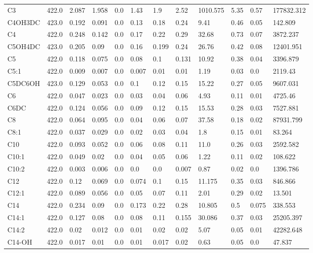 \begin{tabular}{llllllllllll}
C3 & 422.0 & 2.087 & 1.958 & 0.0 & 1.43 & 1.9 & 2.52 & 1010.575 & 5.35 & 0.57 & 177832.312 \\
C4OH\C3DC & 423.0 & 0.192 & 0.091 & 0.0 & 0.13 & 0.18 & 0.24 & 9.41 & 0.46 & 0.05 & 142.809 \\
C4 & 422.0 & 0.248 & 0.142 & 0.0 & 0.17 & 0.22 & 0.29 & 32.68 & 0.73 & 0.07 & 3872.237 \\
C5OH\C4DC & 423.0 & 0.205 & 0.09 & 0.0 & 0.16 & 0.199 & 0.24 & 26.76 & 0.42 & 0.08 & 12401.951 \\
C5 & 422.0 & 0.118 & 0.075 & 0.0 & 0.08 & 0.1 & 0.131 & 10.92 & 0.38 & 0.04 & 3396.879 \\
C5:1 & 422.0 & 0.009 & 0.007 & 0.0 & 0.007 & 0.01 & 0.01 & 1.19 & 0.03 & 0.0 & 2119.43 \\
C5DC\C6OH & 423.0 & 0.129 & 0.053 & 0.0 & 0.1 & 0.12 & 0.15 & 15.22 & 0.27 & 0.05 & 9607.031 \\
C6 & 422.0 & 0.047 & 0.023 & 0.0 & 0.03 & 0.04 & 0.06 & 4.93 & 0.11 & 0.01 & 4725.46 \\
C6DC & 422.0 & 0.124 & 0.056 & 0.0 & 0.09 & 0.12 & 0.15 & 15.53 & 0.28 & 0.03 & 7527.881 \\
C8 & 422.0 & 0.064 & 0.095 & 0.0 & 0.04 & 0.06 & 0.07 & 37.58 & 0.18 & 0.02 & 87931.799 \\
C8:1 & 422.0 & 0.037 & 0.029 & 0.0 & 0.02 & 0.03 & 0.04 & 1.8 & 0.15 & 0.01 & 83.264 \\
C10 & 422.0 & 0.093 & 0.052 & 0.0 & 0.06 & 0.08 & 0.11 & 11.0 & 0.26 & 0.03 & 2592.582 \\
C10:1 & 422.0 & 0.049 & 0.02 & 0.0 & 0.04 & 0.05 & 0.06 & 1.22 & 0.11 & 0.02 & 108.622 \\
C10:2 & 422.0 & 0.003 & 0.006 & 0.0 & 0.0 & 0.0 & 0.007 & 0.87 & 0.02 & 0.0 & 1396.786 \\
C12 & 422.0 & 0.12 & 0.069 & 0.0 & 0.074 & 0.1 & 0.15 & 11.175 & 0.35 & 0.03 & 846.866 \\
C12:1 & 422.0 & 0.089 & 0.056 & 0.0 & 0.05 & 0.07 & 0.11 & 2.01 & 0.29 & 0.02 & 13.501 \\
C14 & 422.0 & 0.234 & 0.09 & 0.0 & 0.173 & 0.22 & 0.28 & 10.805 & 0.5 & 0.075 & 338.553 \\
C14:1 & 422.0 & 0.127 & 0.08 & 0.0 & 0.08 & 0.11 & 0.155 & 30.086 & 0.37 & 0.03 & 25205.397 \\
C14:2 & 422.0 & 0.02 & 0.012 & 0.0 & 0.01 & 0.02 & 0.02 & 5.07 & 0.05 & 0.01 & 42282.648 \\
C14-OH & 422.0 & 0.017 & 0.01 & 0.0 & 0.01 & 0.017 & 0.02 & 0.63 & 0.05 & 0.0 & 47.837 \\

\end{tabular}
